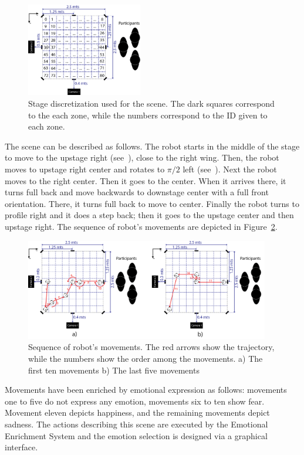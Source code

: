 \begin{figure}
	\centering
	\includegraphics[width=0.45\textwidth]{./Images/FourthCaseScene.png} 
	\caption{Stage discretization  used for the scene. The dark squares correspond to the each zone, while the numbers correspond to the ID given to each zone.}
	\label{fig:stage_division}
\end{figure} 

The scene can be described as follows. The robot starts in the middle of the stage to move to the upstage right (see~\cite{Musical}), close to the right wing. Then, the robot moves to upstage right center and rotates to $\pi/2$ left (see~\cite{Artopia}). Next the robot moves to the right center. Then it goes to the center. When it arrives there, it turns full back and move backwards to downstage center with a full front orientation. There, it turns full back to move to center. Finally the robot turns to profile right and it does a step back; then it goes to the upstage center and then upstage right. The sequence of robot's movements are depicted in Figure~\ref{fig:movement}.
\begin{figure}
	\centering
	\includegraphics[width=0.95\textwidth]{./Images/fourthCaseSceneD.png} 
	\caption{Sequence of robot's movements. The red arrows show the trajectory, while the numbers show the order among the movements. a) The first ten movements b) The last five movements }
	\label{fig:movement}
\end{figure}

Movements have been enriched by emotional expression as follows: movements one to five do not express any emotion, movements six to ten show fear. Movement eleven depicts happiness, and the remaining movements depict sadness. The actions describing this scene are executed by the Emotional Enrichment System and the emotion selection is designed via a graphical interface.

